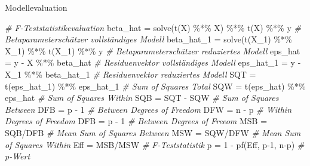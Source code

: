 \documentclass[
  8pt,
  ignorenonframetext,
]{beamer}
\newenvironment{Shaded}{\begin{snugshade}}{\end{snugshade}}
\newcommand{\CommentTok}[1]{\textcolor[rgb]{0.56,0.35,0.01}{\textit{#1}}}
\newcommand{\DecValTok}[1]{\textcolor[rgb]{0.00,0.00,0.81}{#1}}
\newcommand{\FunctionTok}[1]{\textcolor[rgb]{0.00,0.00,0.00}{#1}}
\newcommand{\NormalTok}[1]{#1}
\newcommand{\OtherTok}[1]{\textcolor[rgb]{0.56,0.35,0.01}{#1}}
\newcommand{\SpecialCharTok}[1]{\textcolor[rgb]{0.00,0.00,0.00}{#1}}
\begin{document}
\begin{frame}[fragile]{Modellevaluation}
\begin{Shaded}
\begin{Highlighting}[]
\CommentTok{\# F{-}Teststatistikevaluation}
\NormalTok{beta\_hat   }\OtherTok{=} \FunctionTok{solve}\NormalTok{(}\FunctionTok{t}\NormalTok{(X) }\SpecialCharTok{\%*\%}\NormalTok{ X) }\SpecialCharTok{\%*\%} \FunctionTok{t}\NormalTok{(X) }\SpecialCharTok{\%*\%}\NormalTok{ y          }\CommentTok{\# Betaparameterschätzer vollständiges Modell}
\NormalTok{beta\_hat\_1 }\OtherTok{=} \FunctionTok{solve}\NormalTok{(}\FunctionTok{t}\NormalTok{(X\_1) }\SpecialCharTok{\%*\%}\NormalTok{ X\_1) }\SpecialCharTok{\%*\%} \FunctionTok{t}\NormalTok{(X\_1) }\SpecialCharTok{\%*\%}\NormalTok{ y    }\CommentTok{\# Betaparameterschätzer reduziertes Modell}
\NormalTok{eps\_hat    }\OtherTok{=}\NormalTok{ y }\SpecialCharTok{{-}}\NormalTok{ X }\SpecialCharTok{\%*\%}\NormalTok{ beta\_hat                        }\CommentTok{\# Residuenvektor vollständiges Modell}
\NormalTok{eps\_hat\_1  }\OtherTok{=}\NormalTok{ y }\SpecialCharTok{{-}}\NormalTok{ X\_1 }\SpecialCharTok{\%*\%}\NormalTok{ beta\_hat\_1                    }\CommentTok{\# Residuenvektor reduziertes Modell}
\NormalTok{SQT        }\OtherTok{=} \FunctionTok{t}\NormalTok{(eps\_hat\_1) }\SpecialCharTok{\%*\%}\NormalTok{ eps\_hat\_1                }\CommentTok{\# Sum of Squares Total}
\NormalTok{SQW        }\OtherTok{=} \FunctionTok{t}\NormalTok{(eps\_hat)   }\SpecialCharTok{\%*\%}\NormalTok{ eps\_hat                  }\CommentTok{\# Sum of Squares Within}
\NormalTok{SQB        }\OtherTok{=}\NormalTok{ SQT }\SpecialCharTok{{-}}\NormalTok{ SQW                                 }\CommentTok{\# Sum of Squares Between}
\NormalTok{DFB        }\OtherTok{=}\NormalTok{ p }\SpecialCharTok{{-}} \DecValTok{1}                                     \CommentTok{\# Between Degrees of Freedom}
\NormalTok{DFW        }\OtherTok{=}\NormalTok{ n }\SpecialCharTok{{-}}\NormalTok{ p                                     }\CommentTok{\# Within  Degrees of Freedom}
\NormalTok{DFB        }\OtherTok{=}\NormalTok{ p }\SpecialCharTok{{-}} \DecValTok{1}                                     \CommentTok{\# Between Degrees of Freeom}
\NormalTok{MSB        }\OtherTok{=}\NormalTok{ SQB}\SpecialCharTok{/}\NormalTok{DFB                                   }\CommentTok{\# Mean Sum of Squares Between}
\NormalTok{MSW        }\OtherTok{=}\NormalTok{ SQW}\SpecialCharTok{/}\NormalTok{DFW                                   }\CommentTok{\# Mean Sum of Squares Within}
\NormalTok{Eff        }\OtherTok{=}\NormalTok{ MSB}\SpecialCharTok{/}\NormalTok{MSW                                   }\CommentTok{\# F{-}Teststatistik}
\NormalTok{p          }\OtherTok{=} \DecValTok{1} \SpecialCharTok{{-}} \FunctionTok{pf}\NormalTok{(Eff, p}\DecValTok{{-}1}\NormalTok{, n}\SpecialCharTok{{-}}\NormalTok{p)                     }\CommentTok{\# p{-}Wert}
\end{Highlighting}
\end{Shaded}
\end{frame}
\end{document}
